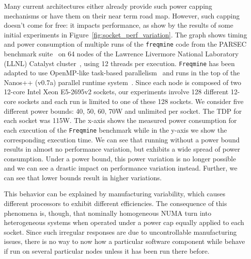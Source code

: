 Many current architectures either already provide such power capping mechanisms or have
them on their near term road map. However, such capping doesn't come for free: it impacts
performance, as show by the results of some initial experiments in
Figure~\ref{fig:socket_perf_variation}.  The graph shows timing and power consumption of
multiple runs of the \texttt{freqmine} code from the PARSEC benchmark
suite~\cite{bienia2008} on 64 nodes of the Lawrence Livermore National Laboratory (LLNL)
Catalyst cluster~\cite{llnlconfluence}, using 12 threads per execution.  \texttt{Freqmine}
has been adapted to use OpenMP-like task-based parallelism~\cite{Chasapis:2015:PEI:2836331.2829952} and runs in
the top of the Nanos++ (v0.7a) parallel runtime system~\cite{nanos}.  Since each node is
composed of two 12-core Intel Xeon E5-2695v2 sockets, our experiments involve 128
different 12-core sockets and each run is limited to one of these 128 sockets.  We
consider five different power bounds: 40, 50, 60, 70W and unlimited per socket.  The TDP
for each socket was 115W. The x-axis shows the measured power consumption for each
execution of the \texttt{Freqmine}  benchmark while in the y-axis we show the
corresponding execution time.  We can see that running without a power bound results in
almost no performance variation, but exhibits a wide spread of power consumption. Under a
power bound, this power variation is no longer possible and we can see a drastic impact on
performance variation instead.  Further, we can see that lower bounds result in higher
variations.

This behavior can be explained by manufacturing variability, which causes different
processors to exhibit different efficiencies. The consequence of this phenomena is,
though, that nominally homogeneous NUMA turn into heterogeneous systems when operated
under a power cap equally applied to each socket.  Since such irregular responses are due
to uncontrollable manufacturing issues, there is no way to now how a particular software
component while behave if run on several particular nodes unless it has been run there
before. 

